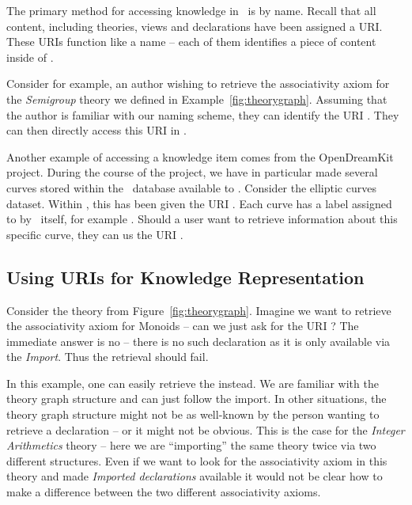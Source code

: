 The primary method for accessing knowledge in \mmt\ is by name.
Recall that all content, including theories, views and declarations have been assigned a URI.
These URIs function like a name -- each of them identifies a piece of content inside of \mmt.

Consider for example, an author wishing to retrieve the associativity axiom for the \textit{Semigroup} theory we defined in Example~\ref{fig:theorygraph}.
Assuming that the author is familiar with our naming scheme, they can identify the URI .
They can then directly access this URI in \mmt.

Another example of accessing a knowledge item comes from the OpenDreamKit project.
During the course of the project, we have in particular made several curves stored within the \lmfdb\ database available to \mmt.
Consider the elliptic curves dataset.
Within \mmt, this has been given the URI .
Each curve has a label assigned to by \lmfdb\ itself, for example .
Should a user want to retrieve information about this specific curve, they can us the URI .

\subsection{Using URIs for Knowledge Representation}\label{sec:name:knowledge}

Consider the  theory from Figure~\ref{fig:theorygraph}.
Imagine we want to retrieve the associativity axiom for Monoids -- can we just ask for the URI ?
The immediate answer is no -- there is no such declaration as it is only available via the \textit{Import}.
Thus the retrieval should fail.

In this example, one can easily retrieve the  instead.
We are familiar with the theory graph structure and can just follow the import.
In other situations, the theory graph structure might not be as well-known by the person wanting to retrieve a declaration -- or it might not be obvious.
This is the case for the \textit{Integer Arithmetics} theory -- here we are ``importing'' the same theory twice via two different structures.
Even if we want to look for the associativity axiom in this theory and made \textit{Imported declarations} available it would not be clear how to make a difference between the two different associativity axioms.

